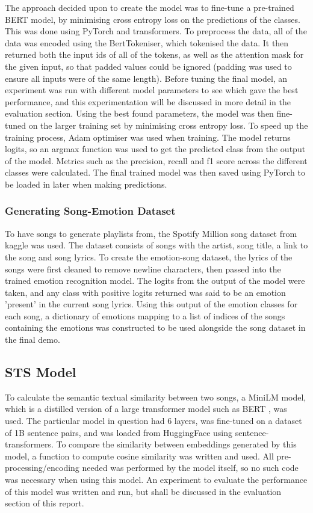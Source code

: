 \documentclass[11pt]{article}
\begin{document}
The approach decided upon to create the model was to fine-tune a pre-trained BERT \cite{bert} model, by minimising cross entropy loss on the predictions of the classes. This was done using PyTorch and transformers. To preprocess the data, all of the data was encoded using the BertTokeniser, which tokenised the data. It then returned both the input ids of all of the tokens, as well as the attention mask for the given input, so that padded values could be ignored (padding was used to ensure all inputs were of the same length). Before tuning the final model, an experiment was run with different model parameters to see which gave the best performance, and this experimentation will be discussed in more detail in the evaluation section. Using the best found parameters, the model was then fine-tuned on the larger training set by minimising cross entropy loss. To speed up the training process, Adam optimiser was used when training. The model returns logits, so an argmax function was used to get the predicted class from the output of the model. Metrics such as the precision, recall and f1 score across the different classes were calculated. The final trained model was then saved using PyTorch to be loaded in later when making predictions.

\subsubsection{Generating Song-Emotion Dataset}
To have songs to generate playlists from, the Spotify Million song dataset \cite{spotify} from kaggle was used. The dataset consists of songs with the artist, song title, a link to the song and song lyrics. To create the emotion-song dataset, the lyrics of the songs were first cleaned to remove newline characters, then passed into the trained emotion recognition model. The logits from the output of the model were taken, and any class with positive logits returned was said to be an emotion 'present' in the current song lyrics. Using this output of the emotion classes for each song, a dictionary of emotions mapping to a list of indices of the songs containing the emotions was constructed to be used alongside the song dataset in the final demo.

\subsection{STS Model}

To calculate the semantic textual similarity between two songs, a MiniLM \cite{minilm} model, which is a distilled version of a large transformer model such as BERT \cite{bert}, was used. The particular model in question had 6 layers, was fine-tuned on a dataset of 1B sentence pairs, and was loaded from HuggingFace \cite{stsmodel} using sentence-transformers. To compare the similarity between embeddings generated by this model, a function to compute cosine similarity was written and used. All pre-processing/encoding needed was performed by the model itself, so no such code was necessary when using this model. 
An experiment to evaluate the performance of this model was written and run, but shall be discussed in the evaluation section of this report.
\end{document}

